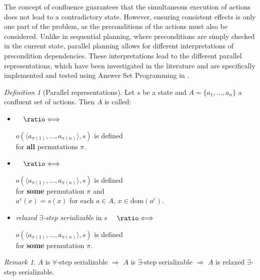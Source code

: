 \documentclass[
     11pt,                    %
     a4paper,             %
     BCOR=10mm,     %
     DIV=14,                 %
     listof=totoc,                    %
     bibliography=totoc,       %
     index=totoc,              %
     parskip            %
     twoside,
     headsepline
     ]{scrreprt}
\theoremstyle{definition}
\theoremstyle{definition}
\theoremstyle{remark}
\newtheorem*{remark}{Remark}
\theoremstyle{bfnote}
\newtheorem{defi}{Definition}
\newcommand*{\logeq}{\ratio\Longleftrightarrow}
\newcommand{\dom}{\mathrm{dom}}
\begin{document}
The concept of confluence guarantees that the simultaneous execution of actions does not lead to a contradictory state.
However, ensuring consistent effects is only one part of the problem, as the preconditions of the actions must also be considered. Unlike in sequential planning, where preconditions are simply checked in the current state, parallel planning allows for different interpretations of precondition dependencies.
These interpretations lead to the different parallel representations, which have been investigated in the literature \parencite{Dimopoulos1997, RINTANEN20061031, Wehrle2007} and are specifically implemented and tested using Answer Set Programming in \textcite{DIMOPOULOS_2019}.

\begin{defi}[Parallel representations]
  Let $s$ be a state and $A = \{a_1, \dots, a_n\}$ a confluent set of actions. Then $A$ is called:

  \begin{itemize}
    \setlength{\itemsep}{1em}

    \item {} $\quad\logeq\quad$ 
    \parbox[t]{0.55\textwidth}{
        $o(\langle a_{\pi(1)}, \dots, a_{\pi(n)} \rangle, s)$ is defined \\ 
        for \textbf{all} permutations $\pi$.
    }

    \item {} $\quad\logeq\quad$ 
    \parbox[t]{0.55\textwidth}{
        $o(\langle a_{\pi(1)}, \dots, a_{\pi(n)} \rangle, s)$ is defined \\
        for \textbf{some} permutation $\pi$ and\\
        $a^c(x) = s(x)$ for each $a \in A$, $x \in \dom(a^c)$.
    }

    \item \textit{relaxed $\exists$-step serializable} in $s$ $\quad\logeq\quad$ 
    \parbox[t]{0.55\textwidth}{
        $o(\langle a_{\pi(1)}, \dots, a_{\pi(n)} \rangle, s)$ is defined \\
        for \textbf{some} permutation $\pi$.
    }
  \end{itemize}
\end{defi}

\begin{remark}
  $A$ is $\forall$-step serializable $\Rightarrow$ $A$ is $\exists$-step serializable $\Rightarrow$ $A$ is relaxed $\exists$-step serializable.
\end{remark}
\end{document}
